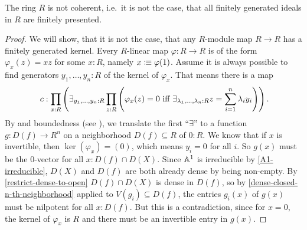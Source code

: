 \begin{theorem}%
  The ring $R$ is not coherent, i.e.\ it is not the case,
  that all finitely generated ideals in $R$ are finitely presented.
\end{theorem}

\begin{proof}
  We will show, that it is not the case,
  that any $R$-module map $R\to R$ has a finitely generated kernel.
  Every $R$-linear map $\varphi:R\to R$
  is of the form $\varphi_x(z) = xz$ for some $x : R$,
  namely $x\vcentcolon\mspace{-1.2mu}\equiv \varphi(1)$.
  Assume it is always possible to find generators $y_1,\dots,y_n:R$ of the kernel of $\varphi_x$.
  That means there is a map
  \[
    c:\prod_{x:R}
    \left(
      \exists_{y_1,\dots,y_n:R}
      \prod_{z:R}
      \left(
        \varphi_x(z)=0 \text{ iff } \exists_{\lambda_1,\dots,\lambda_n:R}z=\sum_{i=1}^n \lambda_i y_i
      \right)
    \right)
    \rlap{.}
  \]
  By  and boundedness (see \cite{draft}),
  we translate the first ``$\exists$'' to a function $g : D(f) \to R^n$
  on a neighborhood $D(f) \subseteq R$ of $0:R$.
  We know that if $x$ is invertible, then $\ker(\varphi_x)=(0)$, which means $y_i=0$ for all $i$.
  So $g(x)$ must be the 0-vector for all $x:D(f)\cap D(X)$.
  Since $\mathbb{A}^1$ is irreducible by \cref{A1-irreducible},
  $D(X)$ and $D(f)$ are both already dense by being non-empty.
  By \cref{restrict-dense-to-open} $D(f)\cap D(X)$ is dense in $D(f)$,
  so by \cref{dense-closed-n-th-neighborhood}
  applied to $V(g_i) \subseteq D(f)$,
  the entries $g_i(x)$ of $g(x)$ must be nilpotent for all $x:D(f)$.
  But this is a contradiction, since for $x = 0$,
  the kernel of $\varphi_x$ is $R$ and there must be an invertible entry in $g(x)$.
\end{proof}
